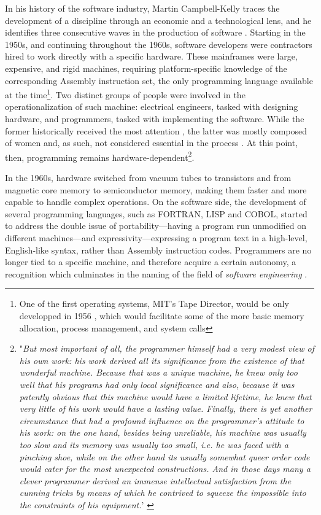 In his history of the software industry, Martin Campbell-Kelly traces the development of a discipline through an economic and a technological lens, and he identifies three consecutive waves in the production of software \citep{campbell-kelly_airline_2003}. Starting in the 1950s, and continuing throughout the 1960s, software developers were contractors hired to work directly with a specific hardware. These mainframes were large, expensive, and rigid machines, requiring platform-specific knowledge of the corresponding Assembly instruction set, the only programming language available at the time\footnote{One of the first operating systems, MIT's Tape Director, would be only developped in 1956 \citep{ross_personal_1986}, which would facilitate some of the more basic memory allocation, process management, and system calls}. Two distinct groups of people were involved in the operationalization of such machine: electrical engineers, tasked with designing hardware, and programmers, tasked with implementing the software. While the former historically received the most attention \citep{ross_personal_1986}, the latter was mostly composed of women and, as such, not considered essential in the process \citep{light_when_1999}. At this point, then, programming remains hardware-dependent\footnote{"\emph{But most important of all, the programmer himself had a very modest view of his own work: his work derived all its significance from the existence of that wonderful machine. Because that was a unique machine, he knew only too well that his programs had only local significance and also, because it was patently obvious that this machine would have a limited lifetime, he knew that very little of his work would have a lasting value. Finally, there is yet another circumstance that had a profound influence on the programmer's attitude to his work: on the one hand, besides being unreliable, his machine was usually too slow and its memory was usually too small, i.e. he was faced with a pinching shoe, while on the other hand its usually somewhat queer order code would cater for the most unexpected constructions. And in those days many a clever programmer derived an immense intellectual satisfaction from the cunning tricks by means of which he contrived to squeeze the impossible into the constraints of his equipment.}' \citep{dijkstra_humble_2007}}.

In the 1960s, hardware switched from vacuum tubes to transistors and from magnetic core memory to semiconductor memory, making them faster and more capable to handle complex operations.  On the software side, the development of several programming languages, such as FORTRAN, LISP and COBOL, started to address the double issue of portability—having a program run unmodified on different machines—and expressivity—expressing a program text in a high-level, English-like syntax, rather than Assembly instruction codes. Programmers are no longer tied to a specific machine, and therefore acquire a certain autonomy, a recognition which culminates in the naming of the field of \emph{software engineering} \citep{randell_nato_1996}.

